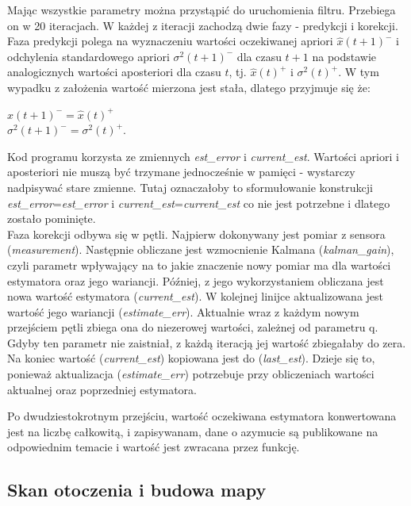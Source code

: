 Mając wszystkie parametry można przystąpić do uruchomienia filtru. Przebiega on w 20 iteracjach. W każdej z iteracji zachodzą dwie fazy - predykcji i korekcji.
\\

Faza predykcji polega na wyznaczeniu wartości oczekiwanej apriori $\hat{x}(t+1)^-$ i odchylenia standardowego apriori $\sigma^2(t+1)^-$ dla czasu $t+1$ na podstawie analogicznych wartości aposteriori dla czasu $t$, tj.  $\hat{x}(t)^+$ i $\sigma^2(t)^+$. W tym wypadku z założenia wartość mierzona jest stała, dlatego przyjmuje się że:
\begin{center}
    $\hat{x}(t+1)^- = \hat{x}(t)^+$ \\
    $\sigma^2(t+1)^- = \sigma^2(t)^+$.    
\end{center}
Kod programu korzysta ze zmiennych \emph{est\_error} i \emph{current\_est}. Wartości apriori i aposteriori nie muszą być trzymane jednocześnie w pamięci - wystarczy nadpisywać stare zmienne. Tutaj oznaczałoby to sformułowanie konstrukcji \emph{est\_error}=\emph{est\_error} i \emph{current\_est}=\emph{current\_est} co nie jest potrzebne i dlatego zostało pominięte.
\\

Faza korekcji odbywa się w pętli. Najpierw dokonywany jest pomiar z sensora (\emph{measurement}). Następnie obliczane jest wzmocnienie Kalmana (\emph{kalman\_gain}), czyli parametr wpływający na to jakie znaczenie nowy pomiar ma dla wartości estymatora oraz jego wariancji. Później, z jego wykorzystaniem obliczana jest nowa wartość estymatora (\emph{current\_est}). W kolejnej linijce aktualizowana jest wartość jego wariancji (\emph{estimate\_err}). Aktualnie wraz z każdym nowym przejściem pętli zbiega ona do niezerowej wartości, zależnej od parametru q. Gdyby ten parametr nie zaistniał, z każdą iteracją jej wartość zbiegałaby do zera. Na koniec wartość (\emph{current\_est}) kopiowana jest do (\emph{last\_est}). Dzieje się to, ponieważ aktualizacja (\emph{estimate\_err}) potrzebuje przy obliczeniach wartości aktualnej oraz poprzedniej estymatora.

Po dwudziestokrotnym przejściu, wartość oczekiwana estymatora konwertowana jest na liczbę całkowitą, i zapisywanam, dane o azymucie są publikowane na odpowiednim temacie i wartość jest zwracana przez funkcję.


\subsection{Skan otoczenia i budowa mapy}
\label{sec:scan}

